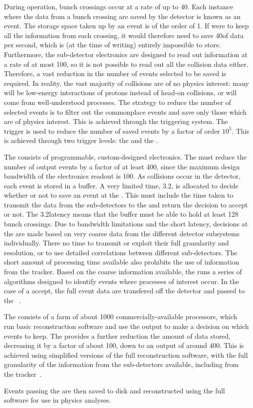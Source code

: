 During operation, bunch crossings occur at a rate of up to 40\MHz. Each instance where the data from a bunch crossing are saved by the detector is known as an event. The storage space taken up by an event is of the order of 1\MB. If \CMS were to keep all the information from each crossing, it would therefore need to save 40\TB of data per second, which is (at the time of writing) entirely impossible to store. Furthermore, the \CMS sub-detector electronics are designed to read out information at a rate of at most 100\kHz, so it is not possible to read out all the collision data either. Therefore, a vast reduction in the number of events selected to be saved is required. In reality, the vast majority of collisions are of no physics interest: many will be low-energy interactions of protons instead of head-on collisions, or will come from well-understood \SM processes. The strategy to reduce the number of selected events is to filter out the commonplace events and save only those which are of physics interest. This is achieved through the \CMS triggering system. The trigger is used to reduce the number of saved events by a factor of order $10^5$. This is achieved through two trigger levels: the \LI and the \HLT.

The \LI consists of programmable, custom-designed electronics. The \LI must reduce the number of output events by a factor of at least 400, since the maximum design bandwidth of the \subdetector electronics readout is 100\kHz. As collisions occur in the \CMS detector, each event is stored in a buffer. A very limited time, 3.2\us, is allocated to decide whether or not to save an event at the \LI. This must include the time taken to transmit the data from the sub-detectors to the \LI and return the decision to accept or not. The 3.2\us latency means that the buffer must be able to hold at least 128 bunch crossings. Due to bandwidth limitations and the short latency, decisions at the \LI are made based on very coarse data from the different detector subsystems individually. There no time to transmit or exploit their full granularity and resolution, or to use detailed correlations between different sub-detectors. The short amount of processing time available also prohibits the use of information from the tracker. Based on the coarse information available, the \LI runs a series of algorithms designed to identify events where processes of interest occur. In the case of a \LI accept, the full event data are transfered off the detector and passed to the \HLT~\cite{CMSatLHC}.

The \HLT consists of a farm of about 1000 commercially-available processors, which run basic reconstruction software and use the output to make a decision on which events to keep. The \HLT provides a further reduction the amount of data stored, decreasing it by a factor of about 100, down to an output of around 400\Hz. This is achieved using simplified versions of the full \CMS reconstruction software, with the full granularity of the information from the \CMS sub-detectors available, including from the tracker~\cite{CMSatLHC}.

Events passing the \HLT are then saved to disk and reconstructed using the full \CMS software for use in physics analyses.

